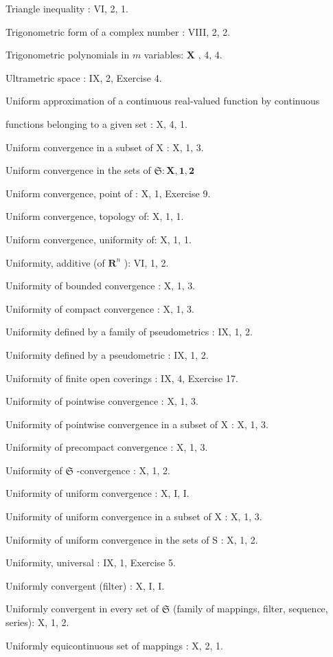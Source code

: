 Triangle inequality : VI, 2, 1.

Trigonometric form of a complex number : VIII, 2, 2.

Trigonometric polynomials in \(m\) variables: \(\mathbf{X}\) , 4, 4.

Ultrametric space : IX, 2, Exercise 4.

Uniform approximation of a continuous real-valued function by continuous

functions belonging to a given set : X, 4, 1.

Uniform convergence in a subset of X : X, 1, 3.

Uniform convergence in the sets of \(\mathfrak{S}:\mathbf{X},\mathbf{1},\mathbf{2}\)

Uniform convergence, point of : X, 1, Exercise 9.

Uniform convergence, topology of: X, 1, 1.

Uniform convergence, uniformity of: X, 1, 1.

Uniformity, additive (of \(\mathbf{R}^n\) ): VI, 1, 2.

Uniformity of bounded convergence : X, 1, 3.

Uniformity of compact convergence : X, 1, 3.

Uniformity defined by a family of pseudometrics : IX, 1, 2.

Uniformity defined by a pseudometric : IX, 1, 2.

Uniformity of finite open coverings : IX, 4, Exercise 17.

Uniformity of pointwise convergence : X, 1, 3.

Uniformity of pointwise convergence in a subset of X : X, 1, 3.

Uniformity of precompact convergence : X, 1, 3.

Uniformity of \(\mathfrak{S}\) -convergence : X, 1, 2.

Uniformity of uniform convergence : X, I, I.

Uniformity of uniform convergence in a subset of X : X, 1, 3.

Uniformity of uniform convergence in the sets of S : X, 1, 2.

Uniformity, universal : IX, 1, Exercise 5.

Uniformly convergent (filter) : X, I, I.

Uniformly convergent in every set of \(\mathfrak{S}\) (family of mappings, filter, sequence, series): X, 1, 2.

Uniformly equicontinuous set of mappings : X, 2, 1.

